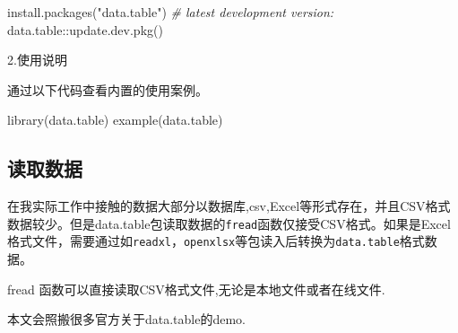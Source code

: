 \documentclass[
]{book}
\newenvironment{Shaded}{\begin{snugshade}}{\end{snugshade}}
\newcommand{\CommentTok}[1]{\textcolor[rgb]{0.56,0.35,0.01}{\textit{#1}}}
\newcommand{\FunctionTok}[1]{\textcolor[rgb]{0.00,0.00,0.00}{#1}}
\newcommand{\NormalTok}[1]{#1}
\newcommand{\SpecialCharTok}[1]{\textcolor[rgb]{0.00,0.00,0.00}{#1}}
\newcommand{\StringTok}[1]{\textcolor[rgb]{0.31,0.60,0.02}{#1}}
\begin{document}
\begin{Shaded}
\begin{Highlighting}[]
\FunctionTok{install.packages}\NormalTok{(}\StringTok{"data.table"}\NormalTok{)}
\CommentTok{\# latest development version:}
\NormalTok{data.table}\SpecialCharTok{::}\FunctionTok{update.dev.pkg}\NormalTok{()}
\end{Highlighting}
\end{Shaded}

2.使用说明

通过以下代码查看内置的使用案例。

\begin{Shaded}
\begin{Highlighting}[]
\FunctionTok{library}\NormalTok{(data.table)}
\FunctionTok{example}\NormalTok{(data.table)}
\end{Highlighting}
\end{Shaded}

\hypertarget{ux8bfbux53d6ux6570ux636e}{%
\subsection{读取数据}\label{ux8bfbux53d6ux6570ux636e}}

在我实际工作中接触的数据大部分以数据库,csv,Excel等形式存在，并且CSV格式数据较少。但是data.table包读取数据的\texttt{fread}函数仅接受CSV格式。如果是Excel格式文件，需要通过如\texttt{readxl}，\texttt{openxlsx}等包读入后转换为\texttt{data.table}格式数据。

fread 函数可以直接读取CSV格式文件,无论是本地文件或者在线文件.

本文会照搬很多官方关于data.table的demo.
\end{document}
